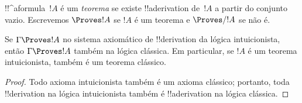 \documentclass[../../../include/open-logic-section]{subfiles}
\begin{document}
\begin{defn}[Teoremas]
!!^a{formula}~$!A$ é um \emph{teorema} se existe !!a{derivation}
de~$!A$ a partir do conjunto vazio. Escrevemos $\Proves !A$ se $!A$ é
um teorema e $\Proves/ !A$ se não é.
\end{defn}

\begin{prop}
  Se $\Gamma \Proves !A$ no sistema axiomático de !!{derivation} da
  lógica intuicionista, então $\Gamma \Proves !A$ também na lógica
  clássica. Em particular, se $!A$ é um teorema intuicionista, também é
  um teorema clássico.
\end{prop}

\begin{proof}
  Todo axioma intuicionista também é um axioma clássico; portanto, toda
  !!{derivation} na lógica intuicionista também é !!a{derivation} na
  lógica clássica.
\end{proof}
\end{document}
